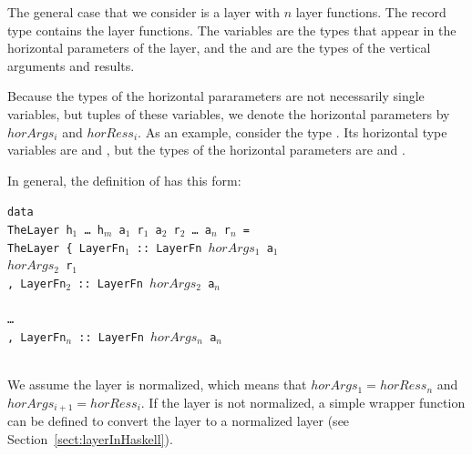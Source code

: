 \documentclass[preprint,natbib]{sigplanconf}
\begin{document}


The general case that we consider is a layer with $n$ layer functions. The record type  contains the layer functions. The  variables are the types that appear in the horizontal parameters of the layer, and the  and  are the types of the vertical arguments and results. 

Because the types of the horizontal pararameters are not necessarily single  variables, but tuples of these variables, we denote the horizontal parameters by $horArgs_i$ and $horRess_i$. As an example, consider the type . Its horizontal  type variables are  and , but the types of the horizontal parameters are  and . 

In general, the definition of  has this form:
\
\begin{small}
\begin{tabbing}
{\tt da}\={\tt ta}\\
\> {\tt Th}\={\tt eLayer h$_1$ \dots ~h$_m$ a$_1$ r$_1$ a$_2$ r$_2$ \dots ~a$_n$ r$_n$ = }\\
\> \> {\tt TheLayer~}\={\tt \{~LayerFn$_1$}\verb| :: |{\tt LayerFn~}\= {\tt $horArgs_1$ a$_1$}\\
\> \>                \>                                             \> {\tt $horArgs_2$ r$_1$}\\
\>\>\> {\tt , LayerFn$_2$}\verb| :: |{\tt LayerFn~}\={\tt $horArgs_2$ a$_n$}\\
\> \>                \>                            \>{\tt $horArgs_3$ r$_n$ \}}\\
\>\>\> {\tt \dots }\\
\>\>\> {\tt , LayerFn$_n$}\verb| :: |{\tt LayerFn~}\={\tt $horArgs_{n}$ a$_n$}\\
\> \>                \>                            \>{\tt $horArgs_1$ r$_n$ \}}\\
\end{tabbing}
\end{small}

We assume the layer is normalized, which means that $horArgs_{1} = horRess_n$ and 
$horArgs_{i+1} = horRess_i$. If the layer is not normalized, a simple wrapper function can be defined to convert the layer to a normalized layer (see Section~\ref{sect:layerInHaskell}).
\end{document}
